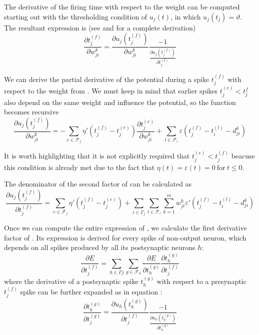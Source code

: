 The derivative of the firing time with respect to the weight can be computed starting out with the thresholding condition of $u_{j}(t)$, in which $u_{j}(t_{j})=\vartheta$. The resultant expression is (see \cite{bohte2002error} and \cite{booij2004temporal} for a complete derivation)
\begin{equation}
\frac{\partial t_{j}^{(f)}}{\partial w_{ji}^{k}}
=
\frac{\partial u_{j}(t_{j}^{(f)})}{\partial w_{ji}^{k}}
\frac{-1}{\frac{\partial u_{j}(t_{j}^{(f)})}{\partial t_{j}^{(f)}}}
\label{eq:dtdw}
\end{equation}

We can derive the partial derivative of the potential during a spike $t_{j}^{(f)}$ with respect to the weight from .
We must keep in mind that earlier spikes $t_{j}^{(e)}<t_{j}^{f}$ also depend on the same weight and influence the potential, so the function becomes recursive
\begin{equation}
\frac{\partial u_{j}(t_{j}^{(f)})}{\partial w_{ji}^{k}}
=
-\sum_{e\in \mathcal{F}_{j}}\eta'(t_{j}^{(f)}-t_{j}^{(e)})
\frac{\partial t_{j}^{(e)}}{\partial w_{ji}^{k}}
+
\sum_{l\in \mathcal{F}_{i}}\varepsilon(t_{j}^{(f)}-t_{i}^{(l)}-d_{ji}^k)
\label{eq:dudw}
\end{equation}

It is worth highlighting that it is not explicitly required that $t_{j}^{(e)}<t_{j}^{(f)}$ beacuse this condition is already met due to the fact that $\eta(t)=\varepsilon(t)=0~\text{for}~t\leq 0$.

The denominator of the second factor of  can be calculated as
\begin{equation}
\frac{\partial u_{j}(t_{j}^{(f)})}{\partial t_{j}^{(f)}}
=
\sum_{e\in \mathcal{F}_{j}}\eta'(t_{j}^{(f)}-t_{j}^{(e)})
+
\sum_{i\in \Gamma_{j}}
\sum_{l\in \mathcal{F}_{i}}
\sum_{k=1}^{m}
	w_{ji}^{k}\varepsilon'(t_{j}^{(f)}-t_{i}^{(l)}-d_{ji}^k)
\label{eq:dudt}
\end{equation}

Once we can compute the entire expression of , we calculate the first derivative factor of . 
Its expression is derived for every spike of non-output neuron, 
which depends on all spikes produced by all its postsynaptic neurons $h$:
\begin{equation}
\frac{\partial E}{\partial t_{j}^{(f)}}
=
\sum_{h\in \Gamma{j}}
\sum_{g\in \mathcal{F}_{h}}
\frac{\partial E}{\partial t_{h}^{(g)}}
\frac{\partial t_{h}^{(g)}}{\partial t_{j}^{(f)}}
\end{equation}
where the derivative of a postsynaptic spike $t_{h}^{(g)}$ with respect to a presynaptic $t_{j}^{(f)}$ spike can be further expanded as in equation :
\begin{equation}
\frac{\partial t_{h}^{(g)}}{\partial t_{j}^{(g)}}
=
\frac{\partial u_{h}(t_{h}^{(g)})}{\partial t_{j}^{(f)}}
\frac{-1}{\frac{
\partial u_{h}(t_{h}^{(g)})}{\partial t_{h}^{(g)}}}
\end{equation}

